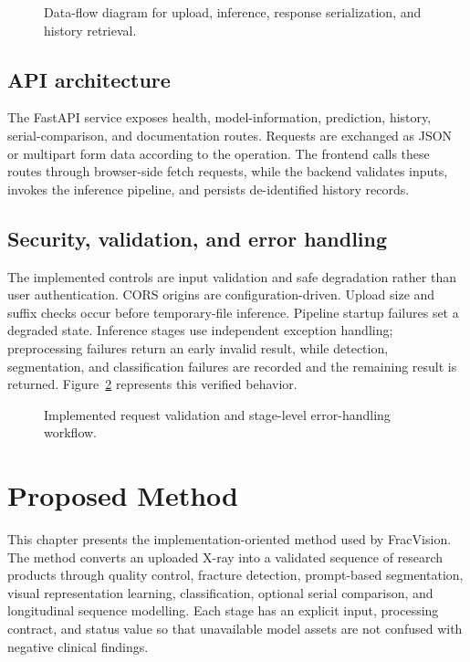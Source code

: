 \documentclass[12pt,a4paper]{article}
\begin{document}
\begin{figure}[H]
\centering
\resizebox{\linewidth}{!}{\FVDataFlowDiagram}
\caption{Data-flow diagram for upload, inference, response serialization, and history retrieval.}
\label{fig:Data Flow Architecture}
\end{figure}

\subsection{API architecture}
The FastAPI service exposes health, model-information, prediction, history, serial-comparison, and documentation routes. Requests are exchanged as JSON or multipart form data according to the operation. The frontend calls these routes through browser-side fetch requests, while the backend validates inputs, invokes the inference pipeline, and persists de-identified history records.

\clearpage
\subsection{Security, validation, and error handling}
The implemented controls are input validation and safe degradation rather than user authentication. CORS origins are configuration-driven. Upload size and suffix checks occur before temporary-file inference. Pipeline startup failures set a degraded state. Inference stages use independent exception handling; preprocessing failures return an early invalid result, while detection, segmentation, and classification failures are recorded and the remaining result is returned. Figure~\ref{fig:Security and Validation Workflow} represents this verified behavior.

\begin{figure}[H]
\centering
\resizebox{0.96\linewidth}{!}{\FVValidationDiagram}
\caption{Implemented request validation and stage-level error-handling workflow.}
\label{fig:Security and Validation Workflow}
\end{figure}

\clearpage
\clearpage
\section{Proposed Method}
This chapter presents the implementation-oriented method used by FracVision. The method converts an uploaded X-ray into a validated sequence of research products through quality control, fracture detection, prompt-based segmentation, visual representation learning, classification, optional serial comparison, and longitudinal sequence modelling. Each stage has an explicit input, processing contract, and status value so that unavailable model assets are not confused with negative clinical findings.
\end{document}
